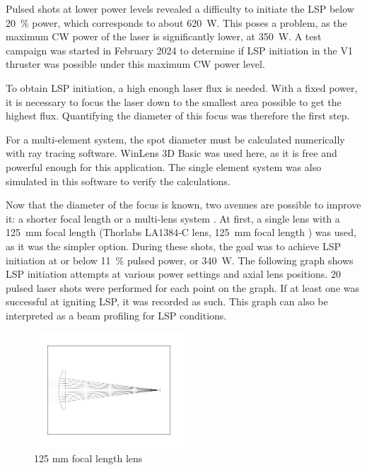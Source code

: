         Pulsed shots at lower power levels revealed a difficulty to initiate the LSP below \qty{20}{\%} power, which corresponds to about \qty{620}{W}. This poses a problem, as the maximum CW power of the laser is significantly lower, at \qty{350}{W}. A test campaign was started in February 2024 to determine if LSP initiation in the V1 thruster was possible under this maximum CW power level.
        
        To obtain LSP initiation, a high enough laser flux is needed. With a fixed power, it is necessary to focus the laser down to the smallest area possible to get the highest flux. Quantifying the diameter of this focus was therefore the first step. 


        For a multi-element system, the spot diameter must be calculated numerically with ray tracing software. WinLens 3D Basic was used here, as it is free and powerful enough for this application. The single element system was also simulated in this software to verify the calculations.

        Now that the diameter of the focus is known, two avenues are possible to improve it: a shorter focal length or a multi-lens system \cite{LensTutorial}. At first, a single lens with a \qty{125}{mm} focal length (Thorlabs LA1384-C lens, \qty{125}{mm} focal length ) was used, as it was the simpler option. During these shots, the goal was to achieve LSP initiation at or below \qty{11}{\%} pulsed power, or \qty{340}{W}. The following graph shows LSP initiation attempts at various power settings and axial lens positions. 20 pulsed laser shots were performed for each point on the graph. If at least one was successful at igniting LSP, it was recorded as such. This graph can also be interpreted as a beam profiling for LSP conditions.
        
        \begin{figure}[!ht]
            \centering
            \includegraphics[width=0.5\textwidth]{assets/4 experiments/125lens.pdf}
            \caption{125 mm focal length lens}
        \end{figure}

